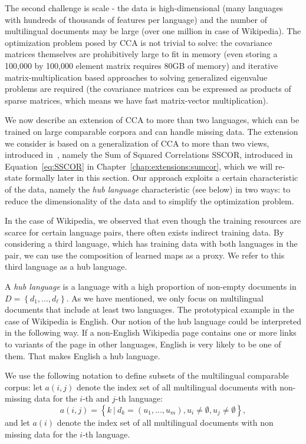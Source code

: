 The second challenge is scale - the data is high-dimensional (many languages with
hundreds of thousands of features per language) and the number of multilingual documents may 
be large (over one million in case of Wikipedia). The optimization problem posed by CCA is not trivial 
to solve: the covariance matrices themselves are prohibitively
large to fit in memory (even storing a 100,000 by 100,000 element matrix requires 
80GB of memory) and iterative matrix-multiplication based approaches to solving generalized 
eigenvalue problems are required (the covariance matrices can be expressed as products 
of sparse matrices, which means we have fast matrix-vector multiplication).

We now describe an extension of CCA to more than two languages, which can be trained on 
large comparable corpora and can handle missing data. The extension we consider is based on 
a generalization of CCA to more than two views, introduced in~\cite{Kettenring}, namely 
the Sum of Squared Correlations SSCOR, introduced in Equation~\ref{eq:SSCOR} in 
Chapter~\ref{chap:extensions:sumcor}, which we will re-state formally later in this section. 
Our approach exploits a certain characteristic of the data, namely the \emph{hub language} 
characteristic (see below) in two ways: to reduce the dimensionality of the data and to 
simplify the optimization problem.

In the case of Wikipedia, we observed that even though the training resources are scarce 
for certain language pairs, there often exists indirect training data. By considering 
a third language, which has training data with both languages in the pair,  we can use 
the composition of learned maps as a proxy. We refer to this third language as a hub language.

A \emph{hub language} is a language with a high proportion of non-empty documents in 
$D = \left\{d_1,..., d_{\ell}\right\}$. As we have mentioned, we only focus on multilingual 
documents that include at least two languages. The prototypical example in the case of 
Wikipedia is English. Our notion of the hub language could be interpreted in the following 
way. If a non-English Wikipedia page contains one or more links to variants of the page in 
other languages, English is very likely to be one of them. That makes English a hub language.

We use the following notation to define subsets of the multilingual comparable corpus: 
let $a(i,j)$ denote the index set of all multilingual documents with non-missing data 
for the $i$-th and $j$-th language: 
$$a(i,j) = \left\{k~ |~ d_k = (u_1,...,u_m), u_i \neq \emptyset, u_j \neq \emptyset \right\},$$ 
and let $a(i)$ denote the index set of all multilingual documents with non missing data 
for the $i$-th language.

